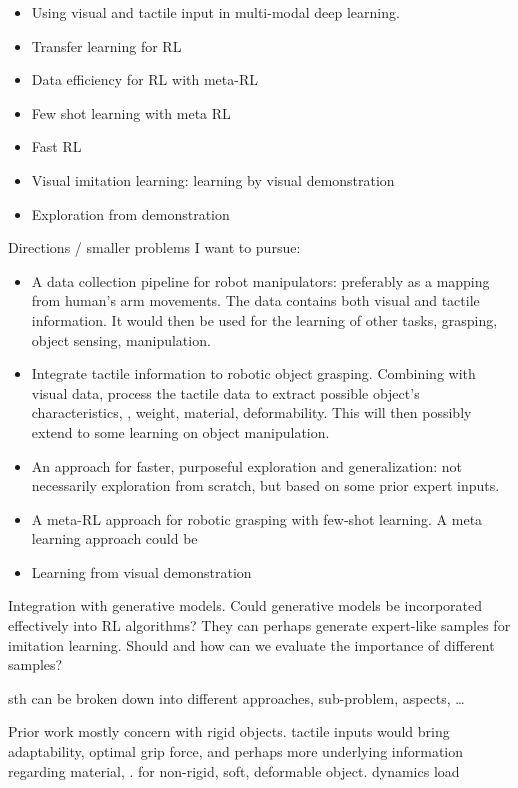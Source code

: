 \begin{itemize}
	\item Using visual and tactile input in multi-modal deep learning.
	\item Transfer learning for \ac{RL}
	\item Data efficiency for \ac{RL} with meta-\ac{RL}
	\item Few shot learning with meta RL
	\item Fast RL
	\item Visual imitation learning: learning by visual demonstration \cite{handa2020dexpilot}
	\item Exploration from demonstration
\end{itemize}

Directions / smaller problems I want to pursue:

\begin{itemize}
	\item A data collection pipeline for robot manipulators: preferably as a mapping from human’s arm movements. The data contains both visual and tactile information. It would then be used for the learning of other tasks, \eg grasping, object sensing, manipulation.
	\item Integrate tactile information to robotic object grasping. Combining with visual data, process the tactile data to extract possible object's characteristics, \eg, weight, material, deformability.
	This will then possibly extend to some learning on object manipulation.
	\item An approach for faster, purposeful exploration and generalization: not necessarily exploration from scratch, but based on some prior expert inputs.
	\item A meta-\ac{RL} approach for robotic grasping with few-shot learning. A meta learning approach could be 
	\item Learning from visual demonstration \todo{}
\end{itemize}
Integration with generative models. Could generative models be incorporated effectively into RL algorithms? They can perhaps generate expert-like samples for imitation learning. Should and how can we evaluate the importance of different samples?

sth can be broken down into different approaches, sub-problem, aspects, \dots

Prior work mostly concern with rigid objects.
tactile inputs would bring adaptability, optimal grip force, and perhaps more underlying information regarding material, \etc. for non-rigid, soft, deformable object. dynamics load

